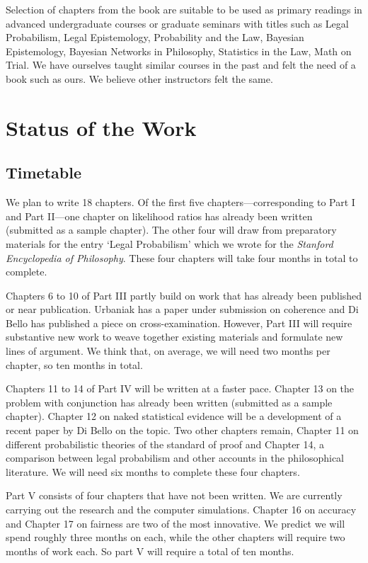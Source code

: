 \documentclass[
  10pt,
  dvipsnames,enabledeprecatedfontcommands]{scrartcl}
\begin{document}
Selection of chapters from the book are suitable to be used as primary
readings in advanced undergraduate courses or graduate seminars with
titles such as Legal Probabilism, Legal Epistemology, Probability and
the Law, Bayesian Epistemology, Bayesian Networks in Philosophy,
Statistics in the Law, Math on Trial. We have ourselves taught similar
courses in the past and felt the need of a book such as ours. We believe
other instructors felt the same.

\hypertarget{status-of-the-work}{%
\section{Status of the Work}\label{status-of-the-work}}

\hypertarget{timetable}{%
\subsection{Timetable}\label{timetable}}

We plan to write 18 chapters. Of the first five chapters---corresponding
to Part I and Part II---one chapter on likelihood ratios has already
been written (submitted as a sample chapter). The other four will draw
from preparatory materials for the entry `Legal Probabilism' which we
wrote for the \textit{Stanford Encyclopedia of Philosophy}. These four
chapters will take four months in total to complete.

Chapters 6 to 10 of Part III partly build on work that has already been
published or near publication. Urbaniak has a paper under submission on
coherence and Di Bello has published a piece on cross-examination.
However, Part III will require substantive new work to weave together
existing materials and formulate new lines of argument. We think that,
on average, we will need two months per chapter, so ten months in total.

Chapters 11 to 14 of Part IV will be written at a faster pace. Chapter
13 on the problem with conjunction has already been written (submitted
as a sample chapter). Chapter 12 on naked statistical evidence will be a
development of a recent paper by Di Bello on the topic. Two other
chapters remain, Chapter 11 on different probabilistic theories of the
standard of proof and Chapter 14, a comparison between legal probabilism
and other accounts in the philosophical literature. We will need six
months to complete these four chapters.

Part V consists of four chapters that have not been written. We are
currently carrying out the research and the computer simulations.
Chapter 16 on accuracy and Chapter 17 on fairness are two of the most
innovative. We predict we will spend roughly three months on each, while
the other chapters will require two months of work each. So part V will
require a total of ten months.
\end{document}
